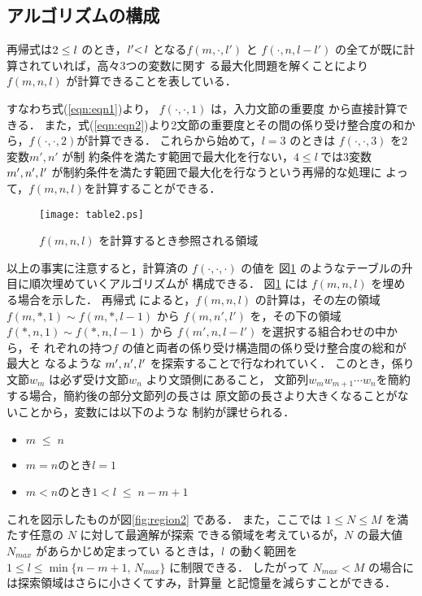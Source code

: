 \subsection{アルゴリズムの構成}
 再帰式は$2{\;\leq\;}l\/$ のとき，$l'{<\,}l\/$ となる$f(m, \cdot , l')$
と $f(\cdot, n, l-l')$ の全てが既に計算されていれば，高々3つの変数に関す
る最大化問題を解くことにより$f(m,n,l)$ が計算できることを表している．

すなわち式(\ref{eqn:eqn1})より， $f(\cdot,\cdot,1)$ は，入力文節の重要度
から直接計算できる．
また，式(\ref{eqn:eqn2})より2文節の重要度とその間の係り受け整合度の和か
ら，$f(\cdot,\cdot,2)$が計算できる．
これらから始めて，$l=3$ のときは $f(\cdot,\cdot,3)$ を2変数$m',n'$ が制
約条件を満たす範囲で最大化を行ない，$4 \leq l\ $では3変数
$m',n',l'\/$ が制約条件を満たす範囲で最大化を行なうという再帰的な処理に
よって，$f(m,n,l)$を計算することができる．


\begin{figure}[hbtp]
 \begin{center}
\texttt{[image: table2.ps]}
  \caption{$f(m,n,l)$ を計算するとき参照される領域}
  \label{fig:region}
 \end{center}
\end{figure}

以上の事実に注意すると，計算済の $f(\cdot,\cdot,\cdot)$ の値を
図\ref{fig:region} のようなテーブルの升目に順次埋めていくアルゴリズムが
構成できる．
図\ref{fig:region} には $f(m,n,l)$ を埋める場合を示した．
再帰式 によると，$f(m,n,l)$ の計算は，その左の領域 $f(m,\ast,1)
\sim f(m,\ast,l-1)$ から $f(m,n',l')$ を，その下の領域 $f(\ast,n,1)
\sim f(\ast,n,l-1)$ から $f(m',n,l-l')$ を選択する組合わせの中から，そ
れぞれの持つ$f$ の値と両者の係り受け構造間の係り受け整合度の総和が最大と
なるような $m',n',l'\/$ を探索することで行なわれていく．
このとき，係り文節$w_m$ は必ず受け文節$w_n$ より文頭側にあること，
文節列$w_mw_{m+1}{\cdots}w_n$を簡約する場合，簡約後の部分文節列の長さは
原文節の長さより大きくなることがないことから，変数には以下のような
制約が課せられる．
\begin{itemize}
 \item $m{\;\leq\;}n$
 \item $m=n$のとき$l=1$
 \item $m<n$のとき$1<l{\;\leq\;}n-m+1$
\end{itemize}
これを図示したものが図\ref{fig:region2} である．
また，ここでは $1 \leq N \leq M$ を満たす任意の $N$ に対して最適解が探索
できる領域を考えているが，$N$ の最大値 $N_{max}$ があらかじめ定まってい
るときは，$l\/$ の動く範囲を $1 \leq l \leq \min\{n-m+1,{\,}N_{max}\}$ 
に制限できる．
したがって $N_{max} < M$ の場合には探索領域はさらに小さくてすみ，計算量
と記憶量を減らすことができる．


